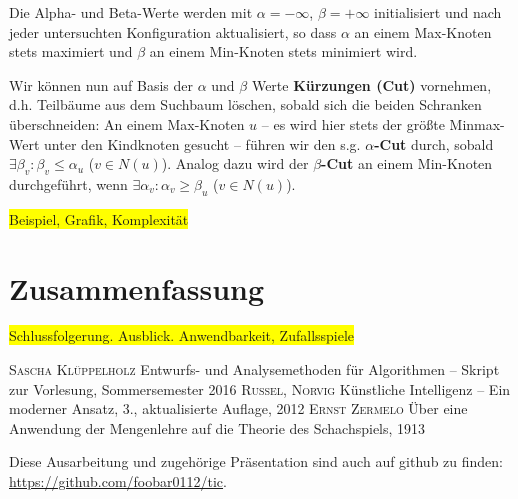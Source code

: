 \documentclass[a4paper,twoside]{scrartcl}
\newcommand\q[1]{\glqq #1\grqq}
\newcommand\todo[1]{\colorbox{yellow}{#1}}
\begin{document}
Die Alpha- und Beta-Werte werden mit $\alpha = -\infty$, $\beta = +\infty$ initialisiert und nach jeder untersuchten Konfiguration aktualisiert, so dass $\alpha$ an einem Max-Knoten stets maximiert und $\beta$ an einem Min-Knoten stets minimiert wird.

Wir können nun auf Basis der $\alpha$ und $\beta$ Werte \textbf{Kürzungen (Cut)} vornehmen, d.h. Teilbäume aus dem Suchbaum löschen, sobald sich die beiden Schranken überschneiden: An einem Max-Knoten $u$ -- es wird hier stets der größte Minmax-Wert unter den Kindknoten gesucht --  führen wir den s.g. \textbf{$\alpha$-Cut} durch, sobald $\exists \beta_v : \beta_v \leq \alpha_u$ ($v \in N(u)$). Analog dazu wird der \textbf{$\beta$-Cut} an einem Min-Knoten durchgeführt, wenn $\exists \alpha_v : \alpha_v \geq \beta_u$ ($v \in N(u)$).


\todo{Beispiel, Grafik, Komplexität}


\section{Zusammenfassung}

\todo{Schlussfolgerung. Ausblick. Anwendbarkeit, Zufallsspiele}


\begin{thebibliography}{99}
   \textsc{Sascha Klüppelholz}
  \newblock \q{Entwurfs- und Analysemethoden für Algorithmen -- Skript zur Vorlesung}, Sommersemester 2016
   \textsc{Russel, Norvig}
  \newblock \q{Künstliche Intelligenz -- Ein moderner Ansatz}, 3., aktualisierte Auflage, 2012
   \textsc{Ernst Zermelo}
  \newblock \q{Über eine Anwendung der Mengenlehre auf die Theorie des Schachspiels}, 1913
\end{thebibliography}


\vspace{4\baselineskip}
Diese Ausarbeitung und zugehörige Präsentation sind auch auf github zu finden: \\\url{https://github.com/foobar0112/tic}.
\end{document}
